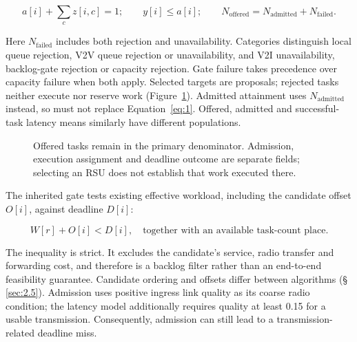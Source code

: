 \documentclass[11pt,a4paper]{article}
\begin{document}
\begin{equation}\label{eq:2}
 a[i]+\sum_c z[i,c]=1;\qquad y[i]\leq a[i];\qquad
 N_{\mathrm{offered}}=N_{\mathrm{admitted}}+N_{\mathrm{failed}}.
\end{equation}

Here $N_{\mathrm{failed}}$ includes both rejection and unavailability. Categories distinguish local queue rejection, V2V queue rejection or unavailability, and V2I unavailability, backlog-gate rejection or capacity rejection. Gate failure takes precedence over capacity failure when both apply. Selected targets are proposals; rejected tasks neither execute nor reserve work (Figure~\ref{fig:2}). Admitted attainment uses $N_{\mathrm{admitted}}$ instead, so must not replace Equation~\eqref{eq:1}. Offered, admitted and successful-task latency means similarly have different populations.

\begin{figure}[htbp]
\centering

\caption{Offered tasks remain in the primary denominator. Admission, execution assignment and deadline outcome are separate fields; selecting an RSU does not establish that work executed there.}\label{fig:2}
\end{figure}

The inherited gate tests existing effective workload, including the candidate offset $O[i]$, against deadline $D[i]$:

\begin{equation}\label{eq:3}
 W[r]+O[i]<D[i],\quad\text{together with an available task-count place.}
\end{equation}

The inequality is strict. It excludes the candidate's service, radio transfer and forwarding cost, and therefore is a backlog filter rather than an end-to-end feasibility guarantee. Candidate ordering and offsets differ between algorithms (\S\,\ref{sec:2.5}). Admission uses positive ingress link quality as its coarse radio condition; the latency model additionally requires quality at least 0.15 for a usable transmission. Consequently, admission can still lead to a transmission-related deadline miss.
\end{document}
